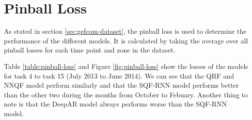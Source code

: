 \section{Pinball Loss}
\label{sec:elaboration-pinball-loss}

As stated in section \ref{sec:gefcom-dataset}, the pinball loss is 
used to determine the performance of the different models. 
It is calculated by taking the average over all pinball losses for each time 
point and zone in the dataset. 

Table \ref{table:pinball-loss} and Figure \ref{fig:pinball-loss} show the 
losses of the models for task 4 to task 15 (July 2013 to June 2014). 
We can see that the QRF and NNQF model perform similarly and that the 
SQF-RNN model performs better than the other two during the months from October to Febuary.
Another thing to note is that the DeepAR model always performs worse than the SQF-RNN model.

